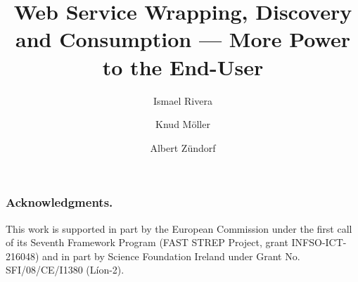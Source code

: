 \documentclass[runningheads,a4paper]{llncs}
\begin{document}
\mainmatter  %

\title{Web Service Wrapping, Discovery and Consumption --- More Power to the End-User}


%
%
\author{Ismael Rivera\and Knud M\"oller\and Albert Z\"undorf}
%


%
%

\maketitle

















\subsubsection*{Acknowledgments.} This work is supported in part by the European Commission under the first call of its Seventh Framework Program (FAST STREP Project, grant INFSO-ICT-216048) and in part by Science Foundation Ireland under Grant No. SFI/08/CE/I1380 (L\'ion-2).
\end{document}

